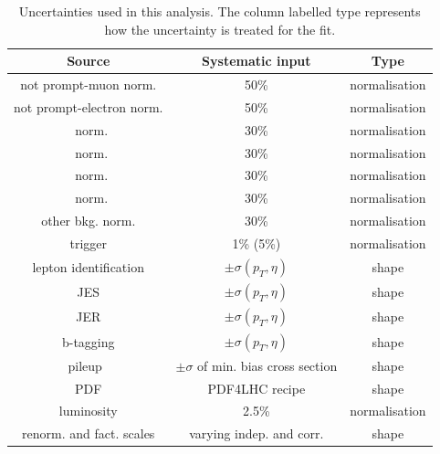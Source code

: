 \begin{table}[htbp]
	\centering
	\caption{Uncertainties used in this analysis. The column labelled type represents how the uncertainty is treated for the fit.}
	\begin{tabular}{ccc}
		\toprule
		Source & Systematic input & Type \\ 
		\midrule 
		not prompt-muon norm. & 50\% & normalisation \\ 
		 
		not prompt-electron norm. & 50\% & normalisation \\ 
		 
		\ttZ\ norm. & 30\% & normalisation \\ 
		 
		 \WZ\ norm. & 30\% & normalisation \\ 
		 
		 \tZq\ norm. & 30\% & normalisation \\ 
		 
		 \ZZ\ norm.& 30\% & normalisation \\ 
		 
		 other bkg. norm. & 30\% & normalisation \\ 
		 
		trigger & 1\% (5\%) & normalisation \\ 
		 
		lepton identification  & $\pm \sigma(p_{T},\eta)$ & shape \\ 
		 
		JES & $\pm \sigma(p_{T},\eta)$ & shape \\ 
		 
		JER & $\pm \sigma(p_{T},\eta)$ &  shape \\ 
		 
		b-tagging & $\pm \sigma(p_{T},\eta)$ & shape \\ 
		 
		pileup\ & $\pm \sigma$ of min. bias cross section &  shape \\ 
		 
		PDF & PDF4LHC recipe &  shape   \\ 
		 
		luminosity & 2.5\% & normalisation \\ 
		 
		renorm. and fact. scales & varying indep. and corr. &  shape \\ 
		\bottomrule
	\end{tabular} 
	\label{tab:nuis}
\end{table}


